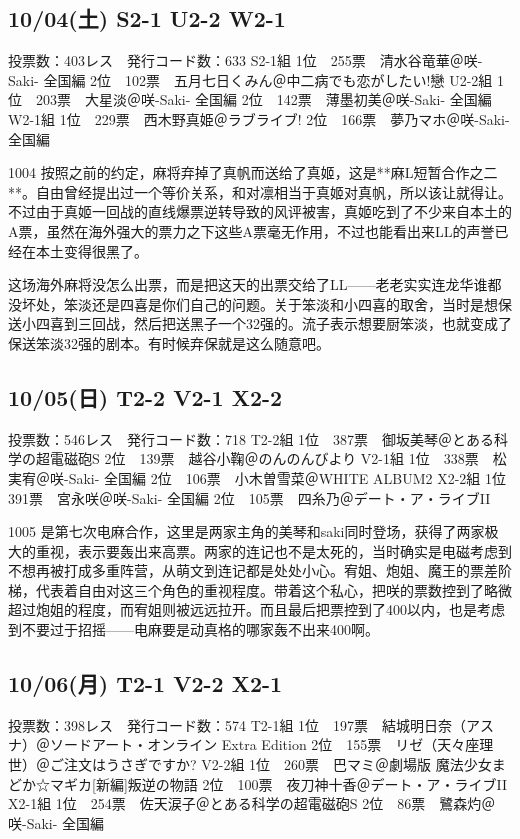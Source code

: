 \subsection{10/04(土) S2-1 U2-2 W2-1}

	投票数：403レス　発行コード数：633
	S2-1組
	1位　255票　清水谷竜華＠咲-Saki- 全国編
	2位　102票　五月七日くみん＠中二病でも恋がしたい!戀
	U2-2組
	1位　203票　大星淡＠咲-Saki- 全国編
	2位　142票　薄墨初美＠咲-Saki- 全国編
	W2-1組
	1位　229票　西木野真姫＠ラブライブ!
	2位　166票　夢乃マホ＠咲-Saki- 全国編

1004 按照之前的约定，麻将弃掉了真帆而送给了真姬，这是**麻L短暂合作之二**。自由曾经提出过一个等价关系，和对凛相当于真姬对真帆，所以该让就得让。不过由于真姬一回战的直线爆票逆转导致的风评被害，真姬吃到了不少来自本土的A票，虽然在海外强大的票力之下这些A票毫无作用，不过也能看出来LL的声誉已经在本土变得很黑了。

这场海外麻将没怎么出票，而是把这天的出票交给了LL——老老实实连龙华谁都没坏处，笨淡还是四喜是你们自己的问题。关于笨淡和小四喜的取舍，当时是想保送小四喜到三回战，然后把送黑子一个32强的。流子表示想要厨笨淡，也就变成了保送笨淡32强的剧本。有时候弃保就是这么随意吧。

\subsection{10/05(日) T2-2 V2-1 X2-2}

	投票数：546レス　発行コード数：718
	T2-2組
	1位　387票　御坂美琴＠とある科学の超電磁砲S
	2位　139票　越谷小鞠＠のんのんびより
	V2-1組
	1位　338票　松実宥＠咲-Saki- 全国編
	2位　106票　小木曽雪菜＠WHITE ALBUM2
	X2-2組
	1位　391票　宮永咲＠咲-Saki- 全国編
	2位　105票　四糸乃＠デート・ア・ライブII

1005 是第七次电麻合作，这里是两家主角的美琴和saki同时登场，获得了两家极大的重视，表示要轰出来高票。两家的连记也不是太死的，当时确实是电磁考虑到不想再被打成多重阵营，从萌文到连记都是处处小心。宥姐、炮姐、魔王的票差阶梯，代表着自由对这三个角色的重视程度。带着这个私心，把咲的票数控到了略微超过炮姐的程度，而宥姐则被远远拉开。而且最后把票控到了400以内，也是考虑到不要过于招摇——电麻要是动真格的哪家轰不出来400啊。

\subsection{10/06(月) T2-1 V2-2 X2-1}

	投票数：398レス　発行コード数：574
	T2-1組
	1位　197票　結城明日奈（アスナ）＠ソードアート・オンライン Extra Edition
	2位　155票　リゼ（天々座理世）＠ご注文はうさぎですか?
	V2-2組
	1位　260票　巴マミ＠劇場版 魔法少女まどか☆マギカ[新編]叛逆の物語
	2位　100票　夜刀神十香＠デート・ア・ライブII
	X2-1組
	1位　254票　佐天涙子＠とある科学の超電磁砲S
	2位　86票　鷺森灼＠咲-Saki- 全国編


